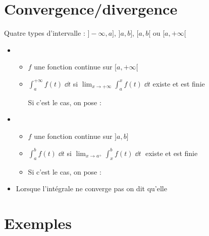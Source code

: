 \section*{Convergence/divergence}
\begin{frame}


Quatre types d'intervalle : $]-\infty,a]$, $]a,b]$, $[a,b[$ ou $[a,+\infty[$

\pause

\begin{mydefinition}
\begin{itemize}
\item 
\begin{itemize}
  \item $f$ une fonction continue sur $[a,+\infty[$
\pause  
  \item $\int_a^{+\infty} f(t)\;\dd t$  si $\lim_{x\rightarrow+\infty} 
\int_a^x f(t)\;\dd t$ existe et est finie

 \pause Si c'est le cas, on pose :
\end{itemize}

\pause

\item 
\begin{itemize}
  \item $f$ une fonction continue sur $]a,b]$
\pause  
  \item $\int_a^b f(t)\;\dd t$  si
 $\lim_{x\rightarrow a^+}  \int_x^b f(t)\;\dd t\;$ existe et est finie
 
 \pause
 
 \item Si c'est le cas, on pose :
  \end{itemize}
\pause

\item Lorsque l'intégrale ne converge pas on dit qu'elle 
\end{itemize}
\end{mydefinition}

\end{frame}



\section*{Exemples}


